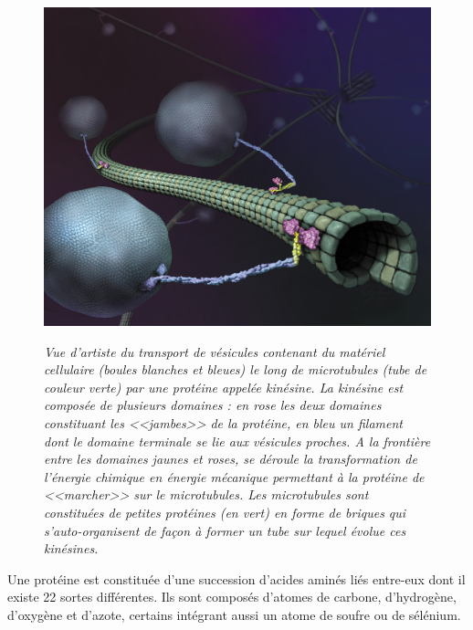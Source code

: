 \begin{figure}[h]
  \centering
  {\includegraphics[width=0.75\linewidth]{./figures/ch1/kinesincargoart}}
    \caption{\it Vue d’artiste du transport de vésicules contenant du matériel cellulaire (boules blanches et bleues) le long de microtubules (tube de couleur verte) par une protéine appelée kinésine. La kinésine est composée de plusieurs domaines : en rose les deux domaines constituant les <<jambes>> de la protéine, en bleu un filament dont le domaine terminale se lie aux vésicules proches. A la frontière entre les domaines jaunes et roses, se déroule la transformation de l'énergie chimique en énergie mécanique permettant à la protéine de <<marcher>> sur le microtubules. Les microtubules sont constituées de petites protéines (en vert) en forme de briques qui s'auto-organisent de façon à former un tube sur lequel évolue ces kinésines.}
    \label{Fig:kinesincargoart}
  \hspace{0.2cm}
\end{figure}


Une protéine est constituée d'une succession d'acides aminés liés entre-eux dont il existe 22 sortes différentes. Ils sont composés d'atomes de carbone, d'hydrogène, d'oxygène et d'azote, certains intégrant aussi un atome de soufre ou de sélénium.


